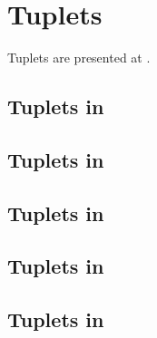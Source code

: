 



\chapter{Tuplets}\label{Tuplets}

Tuplets are presented at .


\section{Tuplets in \mxsrToMsr{}}


\section{Tuplets in \mxsrToMsr{}}


\section{Tuplets in \msrToMsr{}}


\section{Tuplets in \msrToLpsr{}}


\section{Tuplets in \lpsrToLilypond{}}


